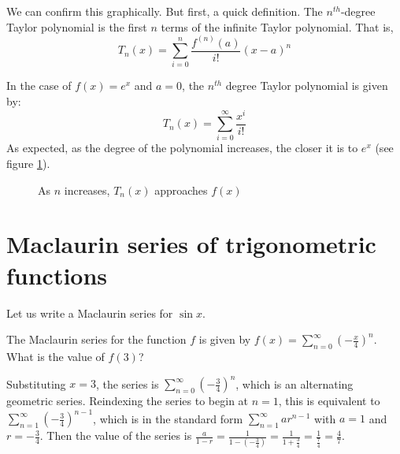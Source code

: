 We can confirm this graphically. But first, a quick definition. The $n^{th}$-degree Taylor polynomial is the first $n$ terms of the infinite Taylor polynomial. That is,
$$T_n(x) = \sum_{i=0}^n \frac{f^{(n)}(a)}{i!}(x - a)^n$$

In the case of $f(x) = e^x$ and $a = 0$, the $n^{th}$ degree Taylor polynomial is given by:
$$T_n(x) = \sum_{i = 0}^\infty \frac{x^i}{i!}$$
As expected, as the degree of the polynomial increases, the closer it is to $e^x$ (see figure \ref{taylorexp}).

\begin{figure}[htbp]
\centering
    \caption{As $n$ increases, $T_n(x)$ approaches $f(x)$}
    \label{taylorexp}
\end{figure}

\section{Maclaurin series of trigonometric functions}
Let us write a Maclaurin series for $\sin{x}$. 

\begin{Exercise} The Maclaurin series for the 
function $f$ is given by $f(x) = \sum_{n=0}^\infty \left( -\frac{x}{4} \right)^
n$. What is the value of $f(3)$?
\end{Exercise}

\begin{Answer}[ref = mac1]
Substituting $x = 3$, the series is $\sum_{n=0}^\infty \left( -\frac{3}{4} 
\right)^n$, which is an alternating geometric series. Reindexing the series to 
begin at $n = 1$, this is equivalent to $\sum_{n = 1}^\infty \left( - 
\frac{3}{4} \right) ^ {n - 1}$, which is in the standard form $\sum_{n=1}^
\infty ar^{n-1}$ with $a = 1$ and $r = -\frac{3}{4}$. Then the value of the 
series is $\frac{a}{1-r} = \frac{1}{1-\left(- \frac{3}{4} \right)} = \frac{1}{1 
+ \frac{3}{4}} = \frac{1}{\frac{7}{4}} = \frac{4}{7}$. 
\end{Answer}

